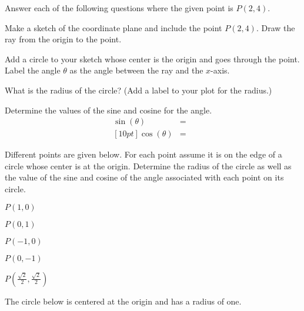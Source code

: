 \begin{problem}
\item Answer each of the following questions where the given point is $P(2,4)$.
  \begin{subproblem}
  \item Make a sketch of the coordinate plane and include the point
    $P(2,4)$. Draw the ray from the origin to the point.
    \vfill
  \item Add a circle to your sketch whose center is the origin and goes
    through the point. Label the angle $\theta$ as the angle between
    the ray and the $x$-axis.
  \item What is the radius of the circle? (Add a label to your plot for the radius.)
    \vspace{2em}
  \item Determine the values of the sine and cosine for the angle.
    \begin{eqnarray*}
      \sin(\theta) & = & \\ [10pt]
      \cos(\theta) & = &
    \end{eqnarray*}
  \end{subproblem}

\clearpage

\item Different points are given below. For each point assume it is
  on the edge of a circle whose center is at the origin.
  Determine the radius of the circle as well as the value of the
  sine and cosine of the angle associated with each point on its circle.
  \begin{subproblem}
  \item $P(1,0)$
    \vfill
  \item $P(0,1)$
    \vfill
  \item $P(-1,0)$
    \vfill
  \item $P(0,-1)$
    \vfill
  \item $P\left(\frac{\sqrt{2}}{2},\frac{\sqrt{2}}{2}\right)$
    \vfill
  \end{subproblem}

\clearpage

\item The circle below is centered at the origin and has a radius of
  one.



\end{problem}
